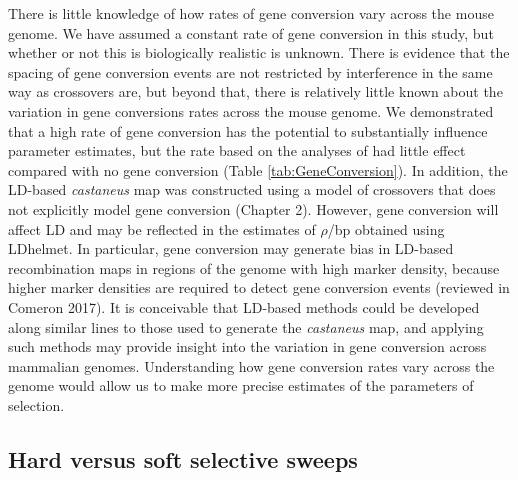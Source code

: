 {	There is little knowledge of how rates of gene conversion vary across the mouse genome. We have assumed a constant rate of gene conversion in this study, but whether or not this is biologically realistic is unknown. There is evidence that the spacing of gene conversion events are not restricted by interference in the same way as crossovers are, but beyond that, there is relatively little known about the variation in gene conversions rates across the mouse genome. We demonstrated that a high rate of gene conversion has the potential to substantially influence parameter estimates, but the rate based on the analyses of \cite{RN263} had little effect compared with no gene conversion (Table \ref{tab:GeneConversion}). In addition, the LD-based \textit{castaneus} map was constructed using a model of crossovers that does not explicitly model gene conversion (Chapter 2). However, gene conversion will affect LD and may be reflected in the estimates of $\rho$/bp obtained using LDhelmet. In particular, gene conversion may generate bias in LD-based recombination maps in regions of the genome with high marker density, because higher marker densities are required to detect gene conversion events (reviewed in Comeron 2017). It is conceivable that LD-based methods could be developed along similar lines to those used to generate the \textit{castaneus} map, and applying such methods may provide insight into the variation in gene conversion across mammalian genomes. Understanding how gene conversion rates vary across the genome would allow us to make more precise estimates of the parameters of selection.

\subsection{Hard versus soft selective sweeps}

}
